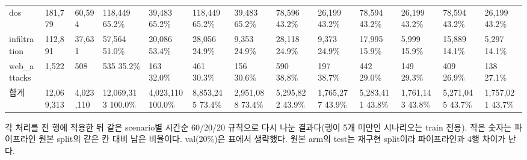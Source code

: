 \begin{landscape}
\begin{longtable}
{}dos & 181,779 & 60,594 & 118,449 65.2\% & 39,483 65.2\% & 118,449 65.2\% & 39,483 65.2\% & 78,596 43.2\% & 26,199 43.2\% & 78,594 43.2\% & 26,199 43.2\% & 78,594 43.2\% & 26,199 43.2\% \\
{}infiltration & 112,891 & 37,631 & 57,564 51.0\% & 20,086 53.4\% & 28,056 24.9\% & 9,353 24.9\% & 28,118 24.9\% & 9,373 24.9\% & 17,995 15.9\% & 5,999 15.9\% & 15,889 14.1\% & 5,297 14.1\% \\
{}web\_\allowbreak{}attacks & 1,522 & 508 & 535 35.2\% & 163 32.0\% & 461 30.3\% & 156 30.6\% & 590 38.8\% & 197 38.7\% & 442 29.0\% & 149 29.3\% & 409 26.9\% & 138 27.1\% \\
{}합계 & 12,069,313 & 4,023,110 & 12,069,313 100.0\% & 4,023,110 100.0\% & 8,853,245 73.4\% & 2,951,088 73.4\% & 5,295,822 43.9\% & 1,765,277 43.9\% & 5,283,411 43.8\% & 1,761,143 43.8\% & 5,271,045 43.7\% & 1,757,021 43.7\% \\
\bottomrule
\end{longtable}
\endgroup
\end{landscape}
각 처리를 전 행에 적용한 뒤 같은 scenario별 시간순 60/\allowbreak{}20/\allowbreak{}20 규칙으로 다시 나눈 결과다(행이 5개 미만인 시나리오는 train 전용). 작은 숫자는 파이프라인 원본 split의 같은 칸 대비 남은 비율이다. val(20\%)은 표에서 생략했다. 원본 arm의 test는 재구현 split이라 파이프라인과 4행 차이가 난다.

